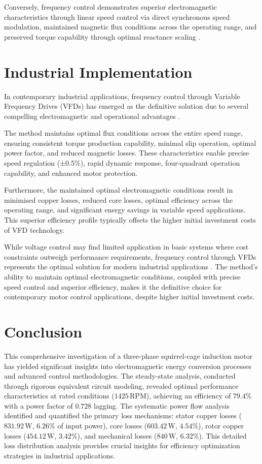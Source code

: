 \documentclass[a4paper,12pt]{IEEEtran}
\begin{document}
Conversely, frequency control demonstrates superior electromagnetic characteristics through linear speed control via direct synchronous speed modulation, maintained magnetic flux conditions across the operating range, and preserved torque capability through optimal reactance scaling \cite{mohan2014}.

\section{Industrial Implementation}
In contemporary industrial applications, frequency control through Variable Frequency Drives (VFDs) has emerged as the definitive solution due to several compelling electromagnetic and operational advantages \cite{sen2021}.

The method maintains optimal flux conditions across the entire speed range, ensuring consistent torque production capability, minimal slip operation, optimal power factor, and reduced magnetic losses. These characteristics enable precise speed regulation (±0.5\%), rapid dynamic response, four-quadrant operation capability, and enhanced motor protection.

Furthermore, the maintained optimal electromagnetic conditions result in minimised copper losses, reduced core losses, optimal efficiency across the operating range, and significant energy savings in variable speed applications. This superior efficiency profile typically offsets the higher initial investment costs of VFD technology.

While voltage control may find limited application in basic systems where cost constraints outweigh performance requirements, frequency control through VFDs represents the optimal solution for modern industrial applications \cite{chapman2021}. The method's ability to maintain optimal electromagnetic conditions, coupled with precise speed control and superior efficiency, makes it the definitive choice for contemporary motor control applications, despite higher initial investment costs.
 
 
 \section{Conclusion}
This comprehensive investigation of a three-phase squirrel-cage induction motor has yielded significant insights into electromagnetic energy conversion processes and advanced control methodologies. The steady-state analysis, conducted through rigorous equivalent circuit modeling, revealed optimal performance characteristics at rated conditions ($1425\,\text{RPM}$), achieving an efficiency of $79.4\%$ with a power factor of $0.728$ lagging. The systematic power flow analysis identified and quantified the primary loss mechanisms: stator copper losses ($831.92\,\text{W}$, $6.26\%$ of input power), core losses ($603.42\,\text{W}$, $4.54\%$), rotor copper losses ($454.12\,\text{W}$, $3.42\%$), and mechanical losses ($840\,\text{W}$, $6.32\%$). This detailed loss distribution analysis provides crucial insights for efficiency optimization strategies in industrial applications.
\end{document}
